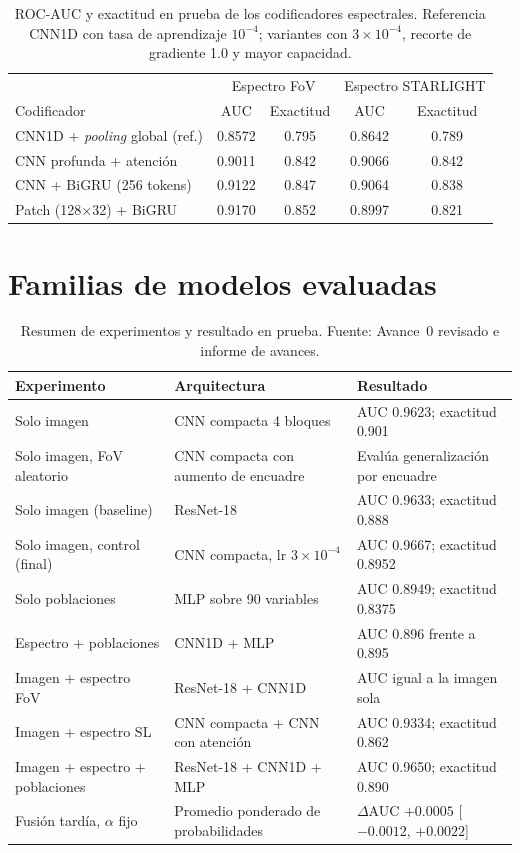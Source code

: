 \documentclass[letterpaper,11pt]{article}
\begin{document}
\begin{table}[H]
  \centering
  \caption{ROC-AUC y exactitud en prueba de los codificadores espectrales. Referencia CNN1D con tasa de aprendizaje $10^{-4}$; variantes con $3\times10^{-4}$, recorte de gradiente 1.0 y mayor capacidad.}
  \label{tab:anx-esp}
  \begin{tabular}{lcccc}
    \toprule
    & \multicolumn{2}{c}{Espectro FoV} & \multicolumn{2}{c}{Espectro STARLIGHT} \\
    Codificador & AUC & Exactitud & AUC & Exactitud \\
    \midrule
    CNN1D + \emph{pooling} global (ref.) & 0.8572 & 0.795 & 0.8642 & 0.789 \\
    CNN profunda + atención & 0.9011 & 0.842 & 0.9066 & 0.842 \\
    CNN + BiGRU (256 tokens) & 0.9122 & 0.847 & 0.9064 & 0.838 \\
    Patch (128$\times$32) + BiGRU & 0.9170 & 0.852 & 0.8997 & 0.821 \\
    \bottomrule
  \end{tabular}
\end{table}

\section{Familias de modelos evaluadas}
\label{anx:familias}
\begin{table}[H]
  \centering
  \caption{Resumen de experimentos y resultado en prueba. Fuente: Avance~0 revisado e informe de avances.}
  \label{tab:anx-fam}
  \small
  \begin{tabular}{p{4.6cm}p{4.4cm}p{5.2cm}}
    \toprule
    Experimento & Arquitectura & Resultado \\
    \midrule
    Solo imagen & CNN compacta 4 bloques & AUC 0.9623; exactitud 0.901 \\
    Solo imagen, FoV aleatorio & CNN compacta con aumento de encuadre & Evalúa generalización por encuadre \\
    Solo imagen (baseline) & ResNet-18 & AUC 0.9633; exactitud 0.888 \\
    Solo imagen, control (final) & CNN compacta, lr $3\times10^{-4}$ & AUC 0.9667; exactitud 0.8952 \\
    Solo poblaciones & MLP sobre 90 variables & AUC 0.8949; exactitud 0.8375 \\
    Espectro + poblaciones & CNN1D + MLP & AUC 0.896 frente a 0.895 \\
    Imagen + espectro FoV & ResNet-18 + CNN1D & AUC igual a la imagen sola \\
    Imagen + espectro SL & CNN compacta + CNN con atención & AUC 0.9334; exactitud 0.862 \\
    Imagen + espectro + poblaciones & ResNet-18 + CNN1D + MLP & AUC 0.9650; exactitud 0.890 \\
    Fusión tardía, $\alpha$ fijo & Promedio ponderado de probabilidades & $\Delta$AUC $+0.0005$ [$-0.0012$, $+0.0022$] \\
    \bottomrule
  \end{tabular}
\end{table}
\end{document}
